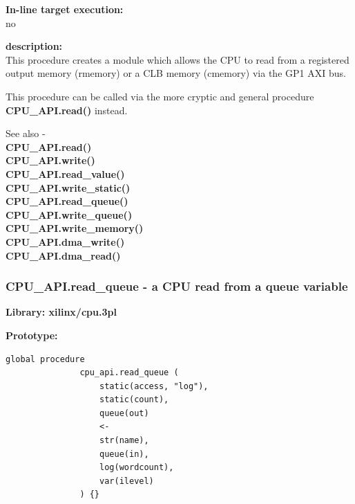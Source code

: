             {\bf In-line target execution:} \\
            no

            {\bf description:} \\
            This procedure creates a module which allows the CPU to read
            from a registered output memory (rmemory) or a CLB memory (cmemory)
            via the GP1 AXI bus.
            
            This procedure can be called via the more cryptic and general
            procedure {\bf CPU\_API.read()}  instead.

            
            
            See also - \\
            {\bf CPU\_API.read()}  \\
            {\bf CPU\_API.write()}  \\
            {\bf CPU\_API.read\_value()}  \\
            {\bf CPU\_API.write\_static()}  \\
            {\bf CPU\_API.read\_queue()}  \\
            {\bf CPU\_API.write\_queue()}  \\
            {\bf CPU\_API.write\_memory()}  \\
            {\bf CPU\_API.dma\_write()}  \\
            {\bf CPU\_API.dma\_read()}  \\



            

            
                





        \subsubsection{CPU\_API.read\_queue - a CPU read from a queue
                                        variable}\label{sec:lpcpurdqueue}

            {\bf Library: xilinx/cpu.3pl}

            {\bf Prototype:} \\
            \vsp
            \begin{lstlisting}[gobble=12, language=threepl]
               global procedure
               cpu_api.read_queue (
                   static(access, "log"),
                   static(count),
                   queue(out)
                   <-
                   str(name),
                   queue(in),
                   log(wordcount),
                   var(ilevel)
               ) {}
            \end{lstlisting}

